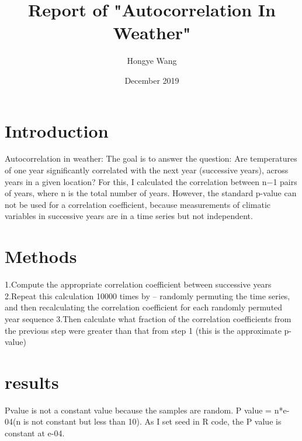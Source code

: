 \documentclass[12pt]{article}
\title{Report of "Autocorrelation In Weather"}
\author{Hongye Wang}
\date{December 2019}
\begin{document}
  \maketitle

  \section{Introduction}
    Autocorrelation in weather: The goal is to answer the question: Are temperatures of one year significantly correlated with the next year (successive years), across years in a given location? For this, I calculated the correlation between n−1 pairs of years, where n is the total number of years. However, the standard p-value can not be used for a correlation coefficient, because measurements of climatic variables in successive years are in a time series but not independent. 

  \section{Methods}
    1.Compute the appropriate correlation coefficient between successive years
    2.Repeat this calculation 10000 times by -- randomly permuting the time series, and then recalculating the correlation coefficient for each randomly permuted year sequence
    3.Then calculate what fraction of the correlation coefficients from the previous step were greater than that from step 1 (this is the approximate p-value)

  \section{results}
    Pvalue is not a constant value because the samples are random. P value = n*e-04(n is not constant but less than 10). As I set seed in R code, the P value is constant at e-04.
    
\end{document}
